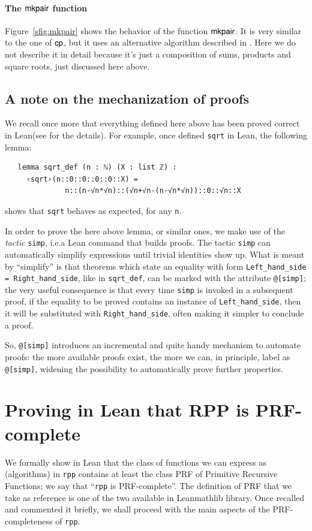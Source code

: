 \documentclass[preprint]{elsarticle}
\theoremstyle{remark}
\newcommand{\RPP}{\textsf{RPP}\xspace}
\newcommand{\PRF}{\textsf{PRF}\xspace}
\newcommand{\MATHLIB}{\textsf{mathlib}\xspace}
\newcommand{\LEAN}{\textsf{Lean}\xspace}
\begin{document}
\paragraph{The $\mathsf{mkpair}$ function}
Figure~\ref{sfig:mkpair} shows the behavior of the function $\mathsf{mkpair}$.
It is very similar to the one of $\mathsf{cp}$, but it uses an alternative algorithm described in \cite{Carneiro19}.
Here we do not describe it in detail because it's just a composition of sums, products and square roots,
just discussed here above.

\subsection{A note on the mechanization of proofs}
We recall once more that everything defined here above has been proved correct in \LEAN (see \cite{MalettoRPPLEAN2021} for the details).
For example, once defined \lstinline|sqrt| in \LEAN, the following lemma:
\begin{lstlisting}
   lemma sqrt_def (n : ℕ) (X : list ℤ) :
     ‹sqrt›(n::0::0::0::0::X) =
              n::(n-√n*√n)::(√n+√n-(n-√n*√n))::0::√n::X
\end{lstlisting}
shows that \lstinline|sqrt| behaves as expected, for any \lstinline|n|.

In order to prove the here above lemma, or similar ones, we make use of the {\it tactic} \lstinline|simp|, i.e.\@ a \LEAN command that builds proofs. The tactic \lstinline|simp| can automatically simplify expressions until trivial identities show up. What is meant by ``simplify'' is that theorems which state an equality with form \texttt{Left\_hand\_side = Right\_hand\_side}, like in \lstinline|sqrt_def|,  can be marked with the attribute \lstinline|@[simp]|; the very useful consequence is that every time \lstinline|simp| is invoked in a subsequent proof, if the equality to be proved contains an instance of \texttt{Left\_hand\_side}, then it will be substituted with \texttt{Right\_hand\_side}, often making it simpler to conclude a proof.

So, \lstinline|@[simp]| introduces an incremental and quite handy mechanism to automate proofs: the more available proofs exist, the more we can, in principle, label as \lstinline|@[simp]|, widening the possibility to automatically prove further properties.



\section{Proving in \LEAN that \RPP is \PRF-complete}
\label{section:The UPRF-completeness of RPP}
We formally show in \LEAN that the class of functions we can express as (algorithms) in \lstinline|rpp| contains at least the class \PRF of Primitive Recursive Functions; we say that ``\lstinline|rpp| is \PRF-complete''. The definition of \PRF that we take as reference is one of the two available in \LEAN \MATHLIB library. Once recalled and commented it briefly, we shall proceed with the main aspects of the \PRF-completeness of \lstinline|rpp|.
\end{document}
